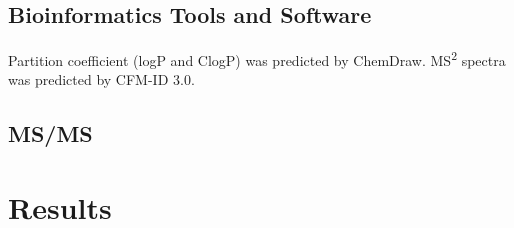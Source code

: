 	\cite{Liu1984}
	
	\subsection{Bioinformatics Tools and Software}
	Partition coefficient (logP and ClogP) was predicted by ChemDraw. 
	MS\textsuperscript{2} spectra was predicted by CFM-ID 3.0\cite{metabo9040072}.
	
	\subsection{MS/MS}
	
	
\section{Results}
